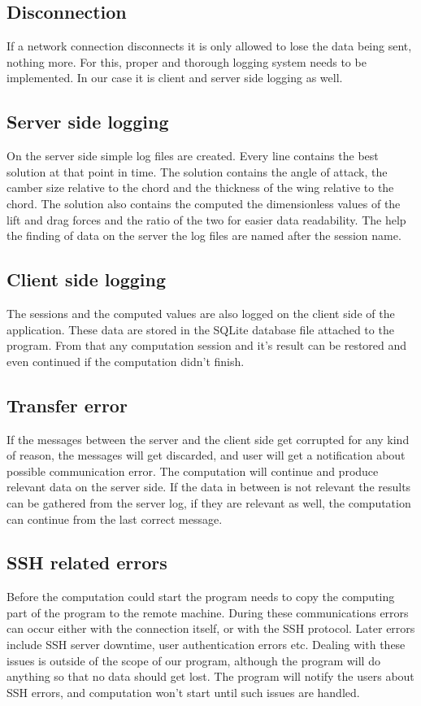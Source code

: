 \documentclass[10pt,a4paper]{report}
\begin{document}
\subsection{Disconnection}
If a network connection disconnects it is only allowed to lose the data being sent, nothing more. For this, proper and thorough logging system needs to be implemented. In our case it is client and server side logging as well.

\subsection{Server side logging}
On the server side simple log files are created. Every line contains the best solution at that point in time. The solution contains the angle of attack, the camber size relative to the chord and the thickness of the wing relative to the chord. The solution also contains the computed the dimensionless values of the lift and drag forces and the ratio of the two for easier data readability. The help the finding of data on the server the log files are named after the session name.

\subsection{Client side logging}
The sessions and the computed values are also logged on the client side of the application. These data are stored in the SQLite database file attached to the program. From that any computation session and it's result can be restored and even continued if the computation didn't finish.

\subsection{Transfer error}
If the messages between the server and the client side get corrupted for any kind of reason, the messages will get discarded, and user will get a notification about possible communication error. The computation will continue and produce relevant data on the server side. If the data in between is not relevant the results can be gathered from the server log, if they are relevant as well, the computation can continue from the last correct message.

\subsection{SSH related errors}
Before the computation could start the program needs to copy the computing part of the program to the remote machine. During these communications errors can occur either with the connection itself, or with the SSH protocol. Later errors include SSH server downtime, user authentication errors etc. Dealing with these issues is outside of the scope of our program, although the program will do anything so that no data should get lost. The program will notify the users about SSH errors, and computation won't start until such issues are handled.
\end{document}
